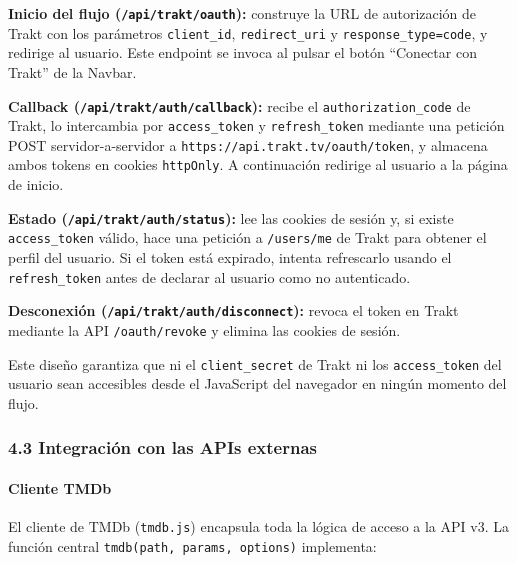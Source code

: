 \documentclass[
]{article}
\begin{document}
\textbf{Inicio del flujo (\texttt{/api/trakt/oauth}):} construye la URL
de autorización de Trakt con los parámetros \texttt{client\_id},
\texttt{redirect\_uri} y \texttt{response\_type=code}, y redirige al
usuario. Este endpoint se invoca al pulsar el botón ``Conectar con
Trakt'' de la Navbar.

\textbf{Callback (\texttt{/api/trakt/auth/callback}):} recibe el
\texttt{authorization\_code} de Trakt, lo intercambia por
\texttt{access\_token} y \texttt{refresh\_token} mediante una petición
POST servidor-a-servidor a \texttt{https://api.trakt.tv/oauth/token}, y
almacena ambos tokens en cookies \texttt{httpOnly}. A continuación
redirige al usuario a la página de inicio.

\textbf{Estado (\texttt{/api/trakt/auth/status}):} lee las cookies de
sesión y, si existe \texttt{access\_token} válido, hace una petición a
\texttt{/users/me} de Trakt para obtener el perfil del usuario. Si el
token está expirado, intenta refrescarlo usando el
\texttt{refresh\_token} antes de declarar al usuario como no
autenticado.

\textbf{Desconexión (\texttt{/api/trakt/auth/disconnect}):} revoca el
token en Trakt mediante la API \texttt{/oauth/revoke} y elimina las
cookies de sesión.

Este diseño garantiza que ni el \texttt{client\_secret} de Trakt ni los
\texttt{access\_token} del usuario sean accesibles desde el JavaScript
del navegador en ningún momento del flujo.

\hypertarget{integraciuxf3n-con-las-apis-externas}{%
\subsubsection{4.3 Integración con las APIs
externas}\label{integraciuxf3n-con-las-apis-externas}}

\hypertarget{cliente-tmdb}{%
\paragraph{Cliente TMDb}\label{cliente-tmdb}}

El cliente de TMDb (\texttt{tmdb.js}) encapsula toda la lógica de acceso
a la API v3. La función central \texttt{tmdb(path,\ params,\ options)}
implementa:
\end{document}
